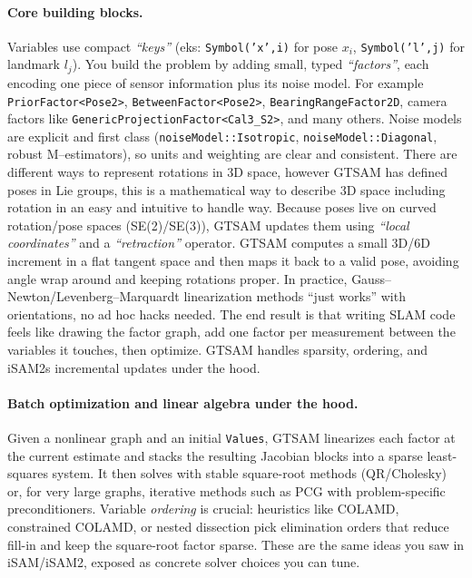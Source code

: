 \paragraph{Core building blocks.}
Variables use compact \textit{``keys''} (eks: \texttt{Symbol('x',i)} for pose $x_i$, \texttt{Symbol('l',j)} for landmark $l_j$). You build the problem by adding small, typed \textit{``factors''}, each encoding one piece of sensor information plus its noise model. For example \texttt{PriorFactor<Pose2>}, \texttt{BetweenFactor<Pose2>}, \texttt{BearingRangeFactor2D}, camera factors like \texttt{GenericProjectionFactor<Cal3\_S2>}, and many others. Noise models are explicit and first class (\texttt{noiseModel::Isotropic}, \texttt{noiseModel::Diagonal}, robust M–estimators), so units and weighting are clear and consistent. There are different ways to represent rotations in 3D space, however GTSAM has defined poses in Lie groups, this is a mathematical way to describe 3D space including rotation in an easy and intuitive to handle way. Because poses live on curved rotation/pose spaces (SE(2)/SE(3)), GTSAM updates them using \textit{``local coordinates''} and a \textit{``retraction''} operator. GTSAM computes a small 3D/6D increment in a flat tangent space and then maps it back to a valid pose, avoiding angle wrap around and keeping rotations proper. In practice, Gauss–Newton/Levenberg–Marquardt linearization methods ``just works'' with orientations, no ad hoc hacks needed. The end result is that writing SLAM code feels like drawing the factor graph, add one factor per measurement between the variables it touches, then optimize. GTSAM handles sparsity, ordering, and iSAM2s incremental updates under the hood. \cite{GTSAM_handbook}





\paragraph{Batch optimization and linear algebra under the hood.}
Given a nonlinear graph and an initial \texttt{Values}, GTSAM linearizes each factor at the current estimate and stacks the resulting Jacobian blocks into a sparse least-squares system. It then solves with stable square-root methods (QR/Cholesky) or, for very large graphs, iterative methods such as PCG with problem-specific preconditioners. Variable \emph{ordering} is crucial: heuristics like COLAMD, constrained COLAMD, or nested dissection pick elimination orders that reduce fill-in and keep the square-root factor sparse. These are the same ideas you saw in iSAM/iSAM2, exposed as concrete solver choices you can tune. \cite{GTSAM_handbook,iSAM2_paper}

